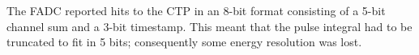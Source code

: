 The FADC reported hits to the CTP in an 8-bit format consisting of a 5-bit channel sum and a 3-bit timestamp. This meant that the pulse integral had to be truncated to fit in 5 bits; consequently some energy resolution was lost. 


